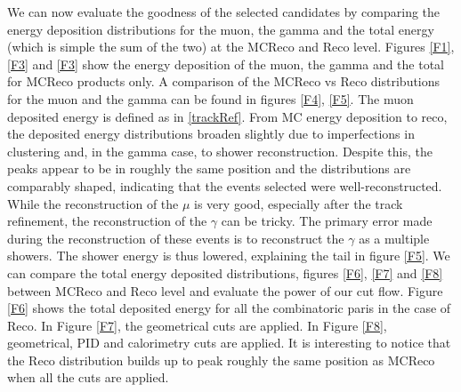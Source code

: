 \documentclass[a4paper, 10pt]{article}
\begin{document}
We can now evaluate the goodness of the selected candidates by comparing the energy deposition distributions for the muon, the gamma and the total energy (which is simple the sum of the two) at the MCReco and Reco level. Figures \ref{F1}, \ref{F3} and \ref{F3} show the energy deposition of the muon, the gamma and the total for MCReco products only. A comparison of the MCReco vs Reco distributions for the muon and the gamma can be found in figures \ref{F4}, \ref{F5}. The muon deposited energy is defined as in \ref{trackRef}. From MC energy deposition to reco, the deposited energy distributions broaden slightly due to imperfections in clustering and, in the gamma case, to shower reconstruction. Despite this, the peaks appear to be in roughly the same position and the distributions are comparably shaped, indicating that the events selected were well-reconstructed.  While the reconstruction of the $\mu$ is very good, especially after the track refinement, the reconstruction of the  $\gamma$ can be tricky. The primary error made during the reconstruction of these events is to reconstruct the $\gamma$ as a multiple showers. The shower energy is thus lowered, explaining the tail in figure \ref{F5}.
We can compare the total energy deposited distributions, figures \ref{F6}, \ref{F7} and \ref{F8} between MCReco and Reco level and evaluate the power of our cut flow. Figure \ref{F6} shows the total deposited energy for all the combinatoric paris in the case of Reco. In Figure \ref{F7}, the geometrical cuts are applied. In Figure \ref{F8}, geometrical, PID and calorimetry cuts are applied. It is interesting to notice that the Reco distribution builds up to peak roughly the same position as MCReco when all the cuts are applied.
\end{document}
